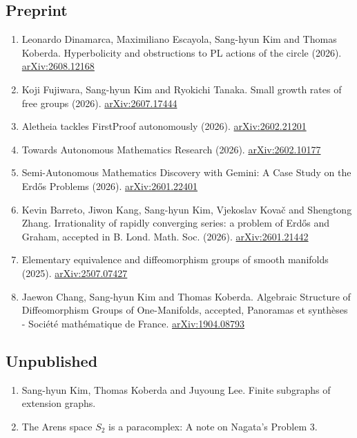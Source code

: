 \documentclass[11pt,a4paper]{article}
\begin{document}
\subsection*{Preprint}
\begin{enumerate}[leftmargin=1.5em, label=\arabic*.]
\item Leonardo Dinamarca, Maximiliano Escayola, Sang-hyun Kim and Thomas Koberda. Hyperbolicity and obstructions to PL actions of the circle (2026). \href{https://arxiv.org/abs/2608.12168}{arXiv:2608.12168}
\item Koji Fujiwara, Sang-hyun Kim and Ryokichi Tanaka. Small growth rates of free groups (2026). \href{https://arxiv.org/abs/2607.17444}{arXiv:2607.17444}
\item Aletheia tackles FirstProof autonomously (2026). \href{https://arxiv.org/abs/2602.21201}{arXiv:2602.21201}
\item Towards Autonomous Mathematics Research (2026). \href{https://arxiv.org/abs/2602.10177}{arXiv:2602.10177}
\item Semi-Autonomous Mathematics Discovery with Gemini: A Case Study on the Erd\H{o}s Problems (2026). \href{https://arxiv.org/abs/2601.22401}{arXiv:2601.22401}
\item Kevin Barreto, Jiwon Kang, Sang-hyun Kim, Vjekoslav Kova\v{c} and Shengtong Zhang. Irrationality of rapidly converging series: a problem of Erd\H{o}s and Graham, accepted in B. Lond. Math. Soc. (2026). \href{https://arxiv.org/abs/2601.21442}{arXiv:2601.21442}
\item Elementary equivalence and diffeomorphism groups of smooth manifolds (2025). \hfil{}\hfilneg\href{https://arxiv.org/abs/2507.07427}{arXiv:2507.07427}
\item Jaewon Chang, Sang-hyun Kim and Thomas Koberda. Algebraic Structure of Diffeomorphism Groups of One-Manifolds, accepted, Panoramas et synth\`eses - Soci\'et\'e math\'ematique de France. \href{https://arxiv.org/abs/1904.08793}{arXiv:1904.08793}
\end{enumerate}

\subsection*{Unpublished}
\begin{enumerate}[leftmargin=1.5em, label=\arabic*.]
\item Sang-hyun Kim, Thomas Koberda and Juyoung Lee. Finite subgraphs of extension graphs.
\item The Arens space $S_2$ is a paracomplex: A note on Nagata's Problem 3.
\end{enumerate}
\end{document}
